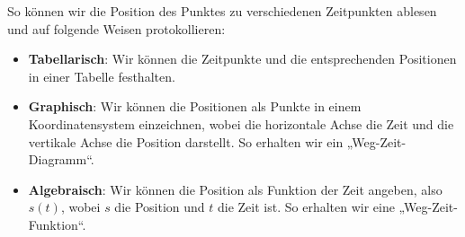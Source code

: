 \begin{center}
\end{center}
So können wir die Position des Punktes zu verschiedenen Zeitpunkten ablesen und auf folgende Weisen protokollieren:
\begin{itemize}
    \item \textbf{Tabellarisch}: Wir können die Zeitpunkte und die entsprechenden Positionen in einer Tabelle festhalten.
    \item \textbf{Graphisch}: Wir können die Positionen als Punkte in einem Koordinatensystem einzeichnen, wobei die horizontale Achse die Zeit und die vertikale Achse die Position darstellt. So erhalten wir ein „Weg-Zeit-Diagramm“.
    \item \textbf{Algebraisch}: Wir können die Position als Funktion der Zeit angeben, also $s(t)$, wobei $s$ die Position und $t$ die Zeit ist. So erhalten wir eine „Weg-Zeit-Funktion“.
\end{itemize}

